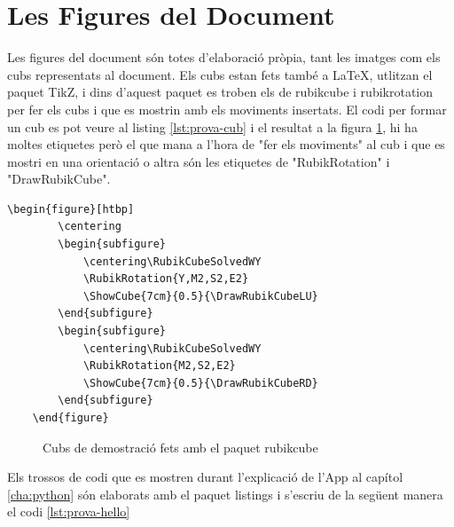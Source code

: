 \section{Les Figures del Document}

Les figures del document són totes d'elaboració pròpia, tant les imatges com els cubs representats al document. 
Els cubs estan fets també a LaTeX, utlitzan el paquet TikZ, i dins d'aquest paquet es troben els de rubikcube i rubikrotation per fer els cubs i que es mostrin amb els moviments insertats.
El codi per formar un cub es pot veure al listing \ref{lst:prova-cub} i el resultat a la figura \ref{fig:cubs-latex}, hi ha moltes etiquetes però el que mana a l'hora de "fer els moviments" al cub i que es mostri en una orientació o altra són les etiquetes de "RubikRotation" i "DrawRubikCube". 


\begin{lstlisting}[style=latex, caption={Exemple de Cubs fets amb el paquet rubikcube}, label={lst:prova-cub}]
    \begin{figure}[htbp]
        \centering
        \begin{subfigure}
            \centering\RubikCubeSolvedWY
            \RubikRotation{Y,M2,S2,E2}
            \ShowCube{7cm}{0.5}{\DrawRubikCubeLU}
        \end{subfigure}
        \begin{subfigure}
            \centering\RubikCubeSolvedWY
            \RubikRotation{M2,S2,E2}
            \ShowCube{7cm}{0.5}{\DrawRubikCubeRD}
        \end{subfigure}
    \end{figure}
\end{lstlisting}

\begin{figure}[htbp]
    \centering
    \begin{subfigure}
        \centering\RubikCubeSolvedWY
    \end{subfigure}
    \begin{subfigure}
        \centering\RubikCubeSolvedWY
    \end{subfigure}
    \caption{Cubs de demostració fets amb el paquet rubikcube}
    \label{fig:cubs-latex}
\end{figure}


Els trossos de codi que es mostren durant l'explicació de l'App al capítol \ref{cha:python} són elaborats amb el paquet listings i s'escriu de la següent manera el codi \ref{lst:prova-hello}


